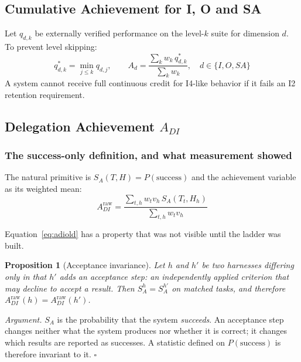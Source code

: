 \documentclass[11pt]{article}
\newtheorem{proposition}{Proposition}
\theoremstyle{definition}
\newcommand{\SA}{\ensuremath{S_A(T,H)}}
\begin{document}
\subsection{Cumulative Achievement for I, O and SA}

Let $q_{d,k}$ be externally verified performance on the level-$k$ suite for dimension $d$. To prevent level skipping:
\begin{equation}
q^{*}_{d,k} = \min_{j \le k} q_{d,j}, \qquad
A_d = \frac{\sum_k w_k\, q^{*}_{d,k}}{\sum_k w_k}, \quad d \in \{I,O,SA\}
\end{equation}
A system cannot receive full continuous credit for I4-like behavior if it fails an I2 retention requirement.

\subsection{Delegation Achievement \texorpdfstring{$A_{DI}$}{A-DI}}\label{sec:adi}

\subsubsection{The success-only definition, and what measurement showed}

The natural primitive is $\SA{} = P(\text{success})$ and the achievement variable as its weighted mean:
\begin{equation}
A_{DI}^{\mathrm{raw}} = \frac{\sum_{t,h} w_t v_h\, S_A(T_t,H_h)}{\sum_{t,h} w_t v_h}
\label{eq:adiold}
\end{equation}

Equation~\eqref{eq:adiold} has a property that was not visible until the ladder was built.

\begin{proposition}[Acceptance invariance]\label{prop:blind}
Let $h$ and $h'$ be two harnesses differing only in that $h'$ adds an acceptance step: an independently applied criterion that may decline to accept a result. Then $S_A^{h} = S_A^{h'}$ on matched tasks, and therefore $A_{DI}^{\mathrm{raw}}(h) = A_{DI}^{\mathrm{raw}}(h')$.
\end{proposition}

\emph{Argument.} $S_A$ is the probability that the system \emph{succeeds}. An acceptance step changes neither what the system produces nor whether it is correct; it changes which results are reported as successes. A statistic defined on $P(\text{success})$ is therefore invariant to it. \hfill$\square$
\end{document}
